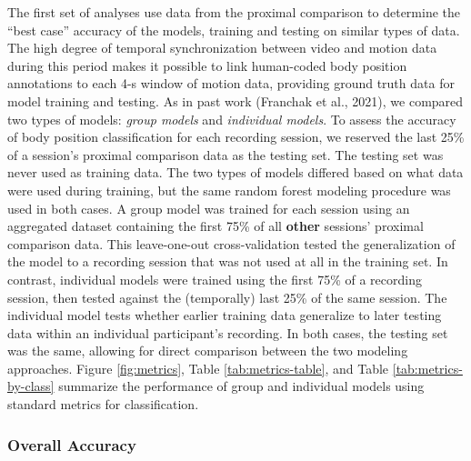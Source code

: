 \documentclass[
  man]{apa6}
\begin{document}
The first set of analyses use data from the proximal comparison to determine the ``best case'' accuracy of the models, training and testing on similar types of data. The high degree of temporal synchronization between video and motion data during this period makes it possible to link human-coded body position annotations to each 4-s window of motion data, providing ground truth data for model training and testing. As in past work (Franchak et al., 2021), we compared two types of models: \emph{group models} and \emph{individual models}. To assess the accuracy of body position classification for each recording session, we reserved the last 25\% of a session's proximal comparison data as the testing set. The testing set was never used as training data. The two types of models differed based on what data were used during training, but the same random forest modeling procedure was used in both cases. A group model was trained for each session using an aggregated dataset containing the first 75\% of all \textbf{other} sessions' proximal comparison data. This leave-one-out cross-validation tested the generalization of the model to a recording session that was not used at all in the training set. In contrast, individual models were trained using the first 75\% of a recording session, then tested against the (temporally) last 25\% of the same session. The individual model tests whether earlier training data generalize to later testing data within an individual participant's recording. In both cases, the testing set was the same, allowing for direct comparison between the two modeling approaches. Figure \ref{fig:metrics}, Table \ref{tab:metrics-table}, and Table \ref{tab:metrics-by-class} summarize the performance of group and individual models using standard metrics for classification.

\hypertarget{overall-accuracy}{%
\subsubsection{Overall Accuracy}\label{overall-accuracy}}
\end{document}
